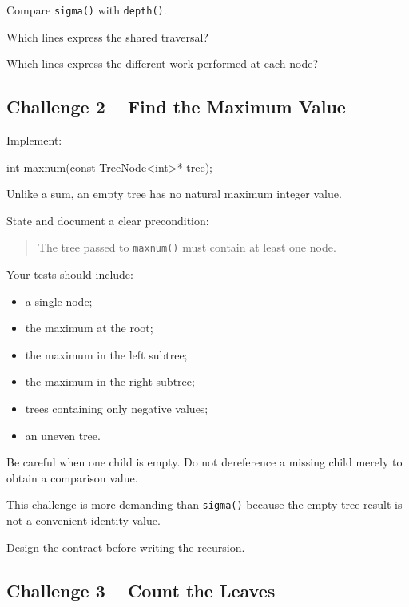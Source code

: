 \documentclass{csc2059practical}
\begin{document}
\begin{reflectionbox}
Compare \texttt{sigma()} with \texttt{depth()}.

Which lines express the shared traversal?

Which lines express the different work performed at each node?
\end{reflectionbox}

\subsection{Challenge 2 -- Find the Maximum Value}

Implement:

\begin{cppcode}
int maxnum(const TreeNode<int>* tree);
\end{cppcode}

Unlike a sum, an empty tree has no natural maximum integer value.

State and document a clear precondition:

\begin{quote}
The tree passed to \texttt{maxnum()} must contain at least one node.
\end{quote}

Your tests should include:

\begin{itemize}
    \item a single node;
    \item the maximum at the root;
    \item the maximum in the left subtree;
    \item the maximum in the right subtree;
    \item trees containing only negative values;
    \item an uneven tree.
\end{itemize}

Be careful when one child is empty. Do not dereference a missing child merely
to obtain a comparison value.

\begin{tipbox}
This challenge is more demanding than \texttt{sigma()} because the
empty-tree result is not a convenient identity value.

Design the contract before writing the recursion.
\end{tipbox}

\subsection{Challenge 3 -- Count the Leaves}
\end{document}
